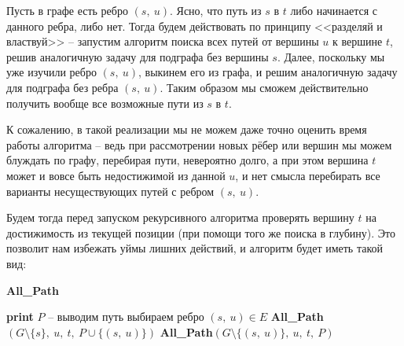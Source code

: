 \documentclass[a4paper,12pt]{article}
\begin{document}
\begin{center}
\end{center}

Пусть в графе есть ребро $(s,\ u)$. Ясно, что путь из $s$ в $t$ либо начинается с данного ребра, либо нет. Тогда будем действовать по принципу <<разделяй и властвуй>> -- запустим алгоритм поиска всех путей от вершины $u$ к вершине $t$, решив аналогичную задачу для подграфа без вершины $s$. Далее, поскольку мы уже изучили ребро $(s,\ u)$, выкинем его из графа, и решим аналогичную задачу для подграфа без ребра $(s,\ u)$. Таким образом мы сможем действительно получить вообще все возможные пути из $s$ в $t$.

К сожалению, в такой реализации мы не можем даже точно оценить время работы алгоритма -- ведь при рассмотрении новых рёбер или вершин мы можем блуждать по графу, перебирая пути, невероятно долго, а при этом вершина $t$ может и вовсе быть недостижимой из данной $u$, и нет смысла перебирать все варианты несуществующих путей с ребром $(s,\ u)$.

Будем тогда перед запуском рекурсивного алгоритма проверять вершину $t$ на достижимость из текущей позиции (при помощи того же поиска в глубину). Это позволит нам избежать уймы лишних действий, и алгоритм будет иметь такой вид:

\begin{algorithm}[H]
    \caption{\textbf{All\_Path}}
    \begin{algorithmic}[1]
        \Statex
            \State \textbf{print} $P$ -- выводим путь
            \State\Return
        \EndIf
        \State выбираем ребро $(s,\ u) \in E$
            \State \textbf{All\_Path}$(G\setminus\{s\},\ u,\ t,\ P\cup\{(s,\ u)\})$
        \EndIf
            \State \textbf{All\_Path}$(G\setminus\{(s,\ u)\},\ u,\ t,\ P)$
        \EndIf
    \end{algorithmic}
\end{algorithm}
\end{document}
